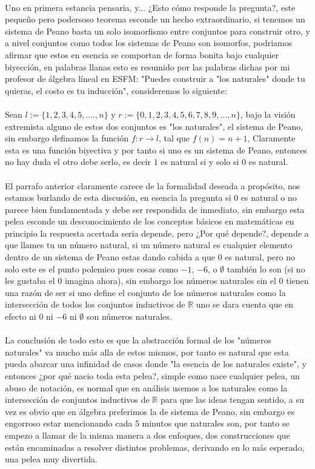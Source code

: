 \documentclass[11pt,letterpaper]{article}
\newcommand{\R}{\mathbb{R}}
\begin{document}
\,\\
Uno en primera estancia pensaria, y... ¿Esto c\'omo responde la pregunta?, este pequeño pero podersoso teorema
esconde un hecho extraordinario, si tenemos un sistema de Peano basta un solo isomorfismo entre conjuntos para construir otro, y a nivel conjuntos
como todos los sistemas de Peano son isomorfos, podriamos afirmar que estos en esencia se comportan de forma bonita
bajo cualquier biyecci\'on, en palabras llanas esto es resumido por las palabras dichas por mi profesor de \'algebra l\'ineal en ESFM:
"Puedes construir a "los naturales"  donde tu quieras, el costo es tu inducci\'on", consideremos lo siguiente:\,\\
\,\\
Sean $l:=\{1,2,3,4,5,....,n\}$ y $r:=\{0,1,2,3,4,5,6,7,8,9,...,n\}$, bajo la visi\'on extremista
alguno de estos dos conjuntos es "los naturales", el sistema de Peano, sin embargo definamos la funci\'on $f:r\rightarrow l$, tal que $f(n)=n+1$, Claramente
esta es una funci\'on biyectiva y por tanto si uno es un sistema de Peano, entonces no hay duda el otro debe serlo, es decir
$1$ es natural si y solo si $0$ es natural.\,\\
\,\\
El parrafo anterior claramente carece de la formalidad deseada a prop\'osito, nos estamos burlando de esta discusi\'on,
en esencia la pregunta si $0$ es natural o no parece bien fundamentada y debe ser respondida de inmediato, sin embargo esta pelea esconde un desconocimiento de los conceptos b\'asicos en matem\'aticas
en principio la respuesta acertada seria depende, pero ¿Por qu\'e depende?, depende a que llames tu un n\'umero natural, si un n\'umero natural
es cualquier elemento dentro de un sistema de Peano estas dando cabida a que $0$ es natural, pero no solo este es el punto polemico pues
cosas como $-1$, $-6$, o $\emptyset$ tambi\'en lo son (si no les gustaba el $0$ imagina ahora), sin embargo los n\'umeros naturales sin el $0$ tienen una raz\'on de ser
si uno define el conjunto de los n\'umeros naturales como la intersecci\'on de todos los conjuntos inductivos de $\R$ uno se dara cuenta que en efecto ni $0$ ni $-6$ ni $\emptyset$ son n\'umeros naturales.\,\\
\,\\
La conclusi\'on de todo esto es que la abstracci\'on formal de los "n\'umeros naturales" va mucho m\'as alla de estos mismos,
por tanto es natural que esta pueda abarcar una infinidad de casos donde "la esencia de los naturales existe", y  entonces ¿por qu\'e nacio toda esta pelea?, simple 
como nace cualquier pelea, un abuso de notaci\'on, es normal que en an\'alisis usemos a los naturales como la intersecci\'on de conjuntos inductivos de $\R$ para que las ideas tengan sentido, a su vez 
es obvio que en \'algebra preferimos la de sistema de Peano, sin embargo es engorroso estar mencionando cada 5 minutos que naturales son, por tanto se empezo a llamar de la misma manera a dos enfoques, dos construcciones
que est\'an encaminadas a resolver distintos problemas, derivando en lo m\'as esperado, una pelea muy divertida.
\end{document}
